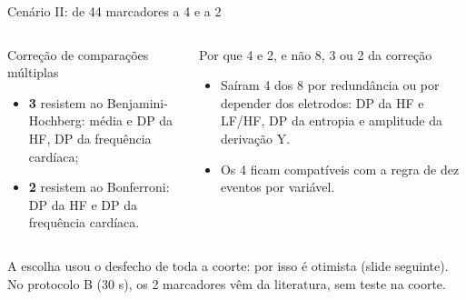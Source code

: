 \documentclass[10pt,aspectratio=169]{beamer}
\newcommand{\fonte}[1]{\par\vfill{\scriptsize\color{cinza}#1}}
\begin{document}
\begin{frame}{Cenário II: de 44 marcadores a 4 e a 2}
  \centering
  \vspace{0.3cm}
  \begin{columns}[T]
    \begin{block}{Correção de comparações múltiplas}
      \footnotesize
      \begin{itemize}
        \item \textbf{3} resistem ao Benjamini-Hochberg: média e DP da HF, DP da frequência cardíaca;
        \item \textbf{2} resistem ao Bonferroni: DP da HF e DP da frequência cardíaca.
      \end{itemize}
    \end{block}
    \begin{block}{Por que 4 e 2, e não 8, 3 ou 2 da correção}
      \footnotesize
      \begin{itemize}
        \item Saíram 4 dos 8 por redundância ou por depender dos eletrodos: DP da HF e LF/HF, DP da entropia e amplitude da derivação Y.
        \item Os 4 ficam compatíveis com a regra de dez eventos por variável.
      \end{itemize}
    \end{block}
  \end{columns}
  \fonte{A escolha usou o desfecho de toda a coorte: por isso é otimista (slide seguinte). No protocolo B (30 s), os 2 marcadores vêm da literatura, sem teste na coorte.}
\end{frame}
\end{document}
